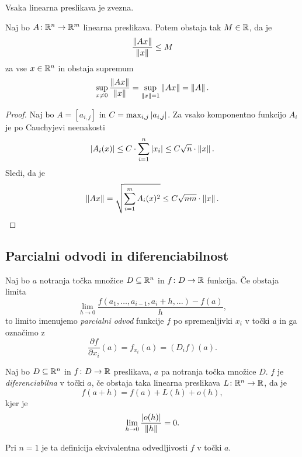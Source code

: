 \begin{posledica}
Vsaka linearna preslikava je zvezna.
\end{posledica}

\begin{trditev}\label{td:1}
Naj bo $A \colon \mathbb{R}^n \to \mathbb{R}^m$ linearna preslikava. Potem obstaja
tak $M \in \mathbb{R}$, da je
\[
\frac{\left\lVert Ax\right\rVert}{\left\lVert x\right\rVert} \leq M
\]
za vse $x \in \mathbb{R}^n$ in obstaja supremum
\[
\sup_{x \ne 0} \frac{\left\lVert Ax\right\rVert}{\left\lVert x\right\rVert} =
\sup_{\left\lVert x\right\rVert = 1}\left\lVert Ax\right\rVert =
\left\lVert A\right\rVert.
\]
\end{trditev}

\begin{proof}
Naj bo $A = [a_{i,j}]$ in $C = \max_{i,j}\left\lvert a_{i,j}\right\rvert$. Za vsako
komponentno funkcijo $A_i$ je po Cauchyjevi neenakosti
\[
\left\lvert A_i(x)\right\rvert \leq
C \cdot \sum_{i=1}^n \left\lvert x_i\right\rvert \leq
C\sqrt{n} \cdot \left\lVert x\right\rVert.
\]
Sledi, da je
\[
\left\lVert Ax\right\rVert =
\sqrt{\sum_{i=1}^m A_i(x)^2} \leq
C \sqrt{nm} \cdot \left\lVert x\right\rVert. \qedhere
\]
\end{proof}

\newpage

\subsection{Parcialni odvodi in diferenciabilnost}

\begin{definicija}
Naj bo $a$ notranja točka množice $D \subseteq \mathbb{R}^n$ in
$f \colon D \to \mathbb{R}$ funkcija. Če obstaja limita
\[
\lim_{h \to 0}
\frac{f(a_1, \dots, a_{i-1}, a_i+h, \dots) - f(a)}{h},
\]
to limito imenujemo
\emph{parcialni odvod} funkcije
$f$ po spremenljivki $x_i$ v točki $a$ in ga označimo z
\[
\frac{\partial f}{\partial x_i}(a) = f_{x_i}(a) = (D_if)(a).
\]
\end{definicija}

\begin{definicija}
Naj bo $D \subseteq \mathbb{R}^n$ in $f \colon D \to \mathbb{R}$ preslikava, $a$ pa
notranja točka množice $D$. $f$ je
\emph{diferenciabilna} v točki
$a$, če obstaja taka linearna preslikava
$L \colon \mathbb{R}^n \to \mathbb{R}$, da je
\[
f(a+h) = f(a) + L(h) + o(h),
\]
kjer je
\[
\lim_{h \to 0}\frac{\left\lvert o(h)\right\rvert}{\left\lVert h\right\rVert} = 0.
\]
\end{definicija}

\begin{opomba}
Pri $n=1$ je ta definicija ekvivalentna odvedljivosti $f$ v točki
$a$.
\end{opomba}

